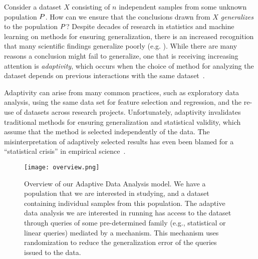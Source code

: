 


Consider a dataset $X$ consisting of $n$ independent samples from some unknown population $P$.  How can we ensure that the conclusions drawn from $X$ \emph{generalizes} to the population $P$?  Despite decades of research in statistics and machine learning on methods for ensuring generalization, there is an increased recognition that many scientific findings generalize poorly (e.g. 
\cite{Ioannidis05,GelmanL13}
).  While there are many reasons a conclusion might fail to generalize, one that is receiving increasing attention is \emph{adaptivity}, which occurs when the choice of method for analyzing the dataset depends on previous interactions with the same dataset~\cite{GelmanL13}.

 Adaptivity can arise from many common practices, such as exploratory data analysis, using the same data set for feature selection and regression, and the re-use of datasets across research projects.  Unfortunately, adaptivity invalidates traditional methods for ensuring generalization and statistical validity, which assume that the method is selected independently of the data. The misinterpretation of adaptively selected results has even been blamed for a ``statistical crisis'' in empirical science~\cite{GelmanL13}.

\begin{figure}
    \centering
    \texttt{[image: overview.png]}
    \caption{Overview of our Adaptive Data Analysis model. We have a population that we are interested in studying, and a dataset containing individual samples from this population. The adaptive data analysis we are interested in running has access to the dataset through queries of some pre-determined family (e.g., statistical or linear queries) mediated by a mechanism. This mechanism uses randomization to reduce the generalization error of the queries issued to the data.}
    \label{fig:adaptivity-model-overview}
\vspace{-0.5cm}
\end{figure}

